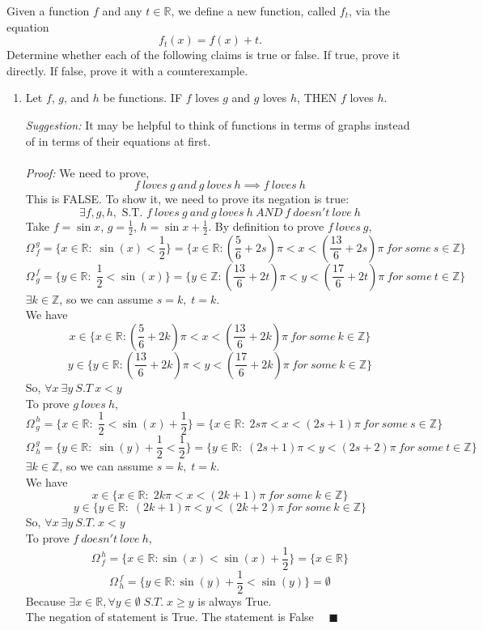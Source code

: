 \documentclass[12pt]{exam}
\newcommand{\vv}{\vspace{.2cm}}
\newcommand{\R}{\mathbb{R}}
\newcommand{\Z}{\mathbb{Z}}
\newcommand{\M}[2]{\Omega^{\, #2}_{\, #1}}
\begin{document}
\begin{enumerate}
	Given a function $f$ and any $t \in \R$, we define a new function, called $f_t$, via the equation
	$$
		f_t(x) = f(x) + t.
	$$
	Determine whether each of the following claims is true or false.  If true, prove it directly.  If false, prove it with a counterexample.
	\begin{enumerate}
		\item  Let $f$, $g$, and $h$ be functions. 
				IF $f$ loves $g$ and $g$ loves $h$,
				THEN $f$ loves $h$.
			
			\vv
			\emph{Suggestion:}  It may be helpful to think of functions in terms of graphs instead of in terms of their equations at first.
			\vv
		\\
		\\
		\emph{Proof:}
		We need to prove,
		$$
		    f\ loves\ g\ and\ g\ loves\ h\implies f\ loves\ h
		$$
		This is FALSE. To show it, we need to prove its negation is true:
		$$
			\exists f, g, h, \mbox{ S.T. }
		    f\ loves\ g\ and\ g\ loves\ h\ AND\ f\ doesn't\ love\ h
		$$
		Take $f=\sin{x}$, $g=\frac{1}{2}$, $h=\sin{x}+\frac{1}{2}$. By definition to prove $f\ loves\ g$,
		$$
		    \M{f}{g} = \{x \in \R : \; \sin(x) < \frac{1}{2} \} = \{x \in \R : (\frac{5}{6}+2s)\pi < x < (\frac{13}{6}+2s)\pi\ for\ some\ s\in\Z\}
		$$
		$$
		    \M{g}{f} = \{y \in \R : \; \frac{1}{2} < \sin(x) \} = \{y \in \Z : (\frac{13}{6}+2t)\pi < y < (\frac{17}{6}+2t)\pi\ for\ some\ t\in\Z\}
		$$
		$\exists k \in \Z$, so we can assume $s = k, \; t = k$.\\
		We have 
		$$
			x \in \{x \in \R : (\frac{5}{6}+2k)\pi < x < (\frac{13}{6}+2k)\pi\ for\ some\ k\in\Z\}
		$$
		$$
			y \in \{y \in \R : (\frac{13}{6}+2k)\pi < y < (\frac{17}{6}+2k)\pi\ for\ some\ k\in\Z\}
		$$
		So, $\forall x\ \exists y\ S.T\ x < y$\\
		To prove $g\ loves\ h$,
		$$ 
			\M{g}{h} = \{x \in \R : \; \frac{1}{2} < \sin(x)+\frac{1}{2} \} = \{x \in \R : \; 2s\pi < x < (2s + 1)\pi\ for\ some\ s\in\Z\}
		$$
		$$ 
			\M{h}{g} = \{y \in \R : \; \sin(y)+\frac{1}{2} < \frac{1}{2} \} = \{y \in \R : \; (2s + 1)\pi < y < (2s + 2)\pi\ for\ some\ t\in\Z\}
		$$
		$\exists k \in \Z$, so we can assume $s = k, \; t = k$.\\
		We have 
		$$
			x \in \{x \in \R : \; 2k\pi < x < (2k + 1)\pi\ for\ some\ k\in\Z\}
		$$
		$$
			y \in \{y \in \R : \; (2k + 1)\pi < y < (2k + 2)\pi\ for\ some\ k\in\Z\}
		$$
		So, $\forall x\ \exists y\ S.T.\ x < y$\\
		To prove $f\ doesn't\ love\ h$,
		$$ 
			\M{f}{h} = \{x \in \R : \sin(x) < \sin(x)+\frac{1}{2} \} = \{x \in \R\}
		$$
		$$ 
			\M{h}{f} = \{y \in \R : \sin(y)+\frac{1}{2} < \sin(y) \} = \emptyset
		$$
		Because $ \exists x \in \R, \forall y \in \emptyset \; S.T. \; x \geq y $ is always True.\\
		The negation of statement is True. The statement is False $\quad \blacksquare$
		

\end{enumerate}
\end{enumerate}
\end{document}
